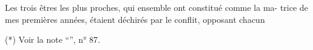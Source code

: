 Les trois êtres les plus proches, qui ensemble ont constitué comme la ma-\newline
trice de mes premières années, étaient déchirés par le conflit, opposant chacun

(*) Voir la note ``'', n° 87.
